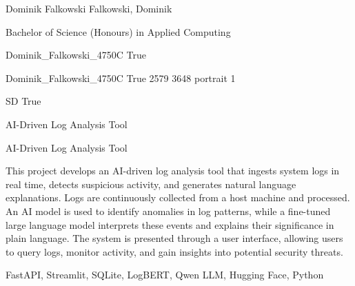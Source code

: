 \documentclass[twoside]{report}
\begin{document}
\begingroup{}\relax



\def\Key{Dominik_Falkowski_4750C}

{Dominik Falkowski}
{Falkowski, Dominik}

{Bachelor of Science (Honours) in Applied Computing}

{Dominik_Falkowski_4750C}
{True}

{Dominik_Falkowski_4750C}
{True}
{2579}
{3648}
{portrait}
{1}

{SD}
{True}

{AI-Driven Log Analysis Tool}

{AI-Driven Log Analysis Tool}

{This project develops an AI-driven log analysis tool that ingests system logs in real time, detects suspicious activity, and generates natural language explanations. Logs are continuously collected from a host machine and processed. An AI model is used to identify anomalies in log patterns, while a fine-tuned large language model interprets these events and explains their significance in plain language. The system is presented through a user interface, allowing users to query logs, monitor activity, and gain insights into potential security threats.}

{FastAPI, Streamlit, SQLite, LogBERT, Qwen LLM, Hugging Face, Python}
\end{document}
